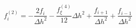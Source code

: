 \begin{equation} 
f^{{(2)}}_{i} = - \frac{2 f_{i}}{{\Delta h}^{2}} - \frac{f^{{(4)}}_{{\xi}}}{12} {\Delta h}^{2} + \frac{f_{{i+1}}}{{\Delta h}^{2}} + \frac{f_{{i-1}}}{{\Delta h}^{2}}
 \end{equation} 
